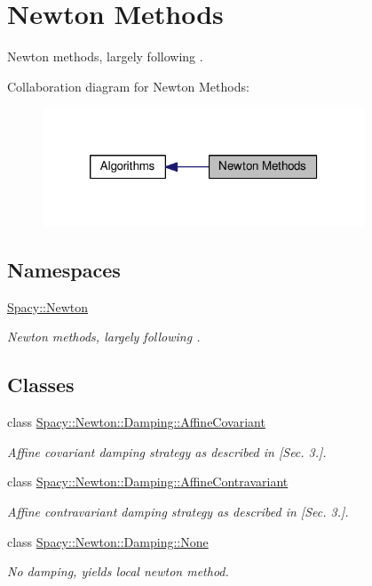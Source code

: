 \hypertarget{group__NewtonGroup}{\section{Newton Methods}
\label{group__NewtonGroup}
}


Newton methods, largely following \cite{Deuflhard2004}.  


Collaboration diagram for Newton Methods\-:
\nopagebreak
\begin{figure}[H]
\begin{center}
\leavevmode
\includegraphics[width=272pt]{group__NewtonGroup}
\end{center}
\end{figure}
\subsection*{Namespaces}
\begin{DoxyCompactItemize}
\item 
\hyperlink{namespaceSpacy_1_1Newton}{Spacy\-::\-Newton}
\begin{DoxyCompactList}\small\item\em Newton methods, largely following \cite{Deuflhard2004}. \end{DoxyCompactList}\end{DoxyCompactItemize}
\subsection*{Classes}
\begin{DoxyCompactItemize}
\item 
class \hyperlink{classSpacy_1_1Newton_1_1Damping_1_1AffineCovariant}{Spacy\-::\-Newton\-::\-Damping\-::\-Affine\-Covariant}
\begin{DoxyCompactList}\small\item\em Affine covariant damping strategy as described in \cite{Deuflhard2004} \mbox{[}Sec. 3.\mbox{]}. \end{DoxyCompactList}\item 
class \hyperlink{classSpacy_1_1Newton_1_1Damping_1_1AffineContravariant}{Spacy\-::\-Newton\-::\-Damping\-::\-Affine\-Contravariant}
\begin{DoxyCompactList}\small\item\em Affine contravariant damping strategy as described in \cite{Deuflhard2004} \mbox{[}Sec. 3.\mbox{]}. \end{DoxyCompactList}\item 
class \hyperlink{classSpacy_1_1Newton_1_1Damping_1_1None}{Spacy\-::\-Newton\-::\-Damping\-::\-None}
\begin{DoxyCompactList}\small\item\em No damping, yields local newton method. \end{DoxyCompactList}\end{DoxyCompactItemize}
